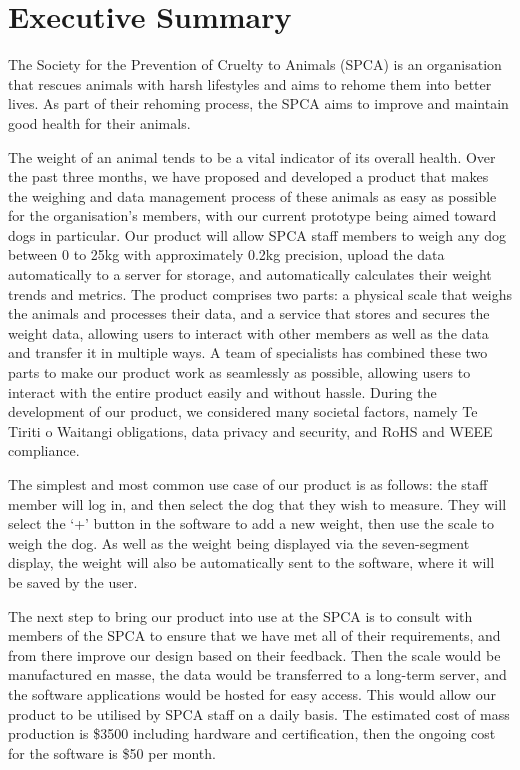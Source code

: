 
\chapter{Executive Summary}

The Society for the Prevention of Cruelty to Animals (SPCA) is an organisation that rescues animals with harsh lifestyles and aims to rehome them into better lives. As part of their rehoming process, the SPCA aims to improve and maintain good health for their animals.

The weight of an animal tends to be a vital indicator of its overall health. Over the past three months, we have proposed and developed a product that makes the weighing and data management process of these animals as easy as possible for the organisation's members, with our current prototype being aimed toward dogs in particular. Our product will allow SPCA staff members to weigh any dog between 0 to 25kg with approximately 0.2kg precision, upload the data automatically to a server for storage, and automatically calculates their weight trends and metrics. The product comprises two parts: a physical scale that weighs the animals and processes their data, and a service that stores and secures the weight data, allowing users to interact with other members as well as the data and transfer it in multiple ways. A team of specialists has combined these two parts to make our product work as seamlessly as possible, allowing users to interact with the entire product easily and without hassle. During the development of our product, we considered many societal factors, namely Te Tiriti o Waitangi obligations, data privacy and security, and RoHS and WEEE compliance. 

The simplest and most common use case of our product is as follows: the staff member will log in, and then select the dog that they wish to measure. They will select the ‘+’ button in the software to add a new weight, then use the scale to weigh the dog. As well as the weight being displayed via the seven-segment display, the weight will also be automatically sent to the software, where it will be saved by the user.

The next step to bring our product into use at the SPCA is to consult with members of the SPCA to ensure that we have met all of their requirements, and from there improve our design based on their feedback. Then the scale would be manufactured en masse, the data would be transferred to a long-term server, and the software applications would be hosted for easy access. This would allow our product to be utilised by SPCA staff on a daily basis. The estimated cost of mass production is \$3500 including hardware and certification, then the ongoing cost for the software is \$50 per month.

